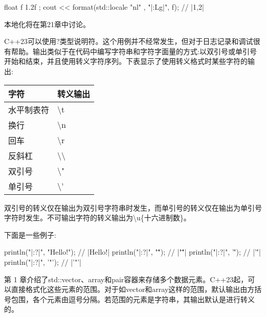 \begin{cpp}
float f { 1.2f };
cout << format(std::locale{ "nl" }, "|{:Lg}|\n", f); // |1,2|
\end{cpp}

本地化将在第21章中讨论。



C++23可以使用?类型说明符。这个用例并不经常发生，但对于日志记录和调试很有帮助。输出类似于在代码中编写字符串和字符字面量的方式:以双引号或单引号开始和结束，并且使用转义字符序列。下表显示了使用转义格式时某些字符的输出:

\begin{longtable}{|l|l|}
\hline
字符       & 转义输出                   \\ \hline
\endfirsthead
%
\endhead
%
水平制表符  & \textbackslash{}t                \\ \hline
换行        & \textbackslash{}n                \\ \hline
回车 & \textbackslash{}r                \\ \hline
反斜杠       & \textbackslash{}\textbackslash{} \\ \hline
双引号    & \textbackslash{}"                \\ \hline
单引号    & \textbackslash{}'                \\ \hline
\end{longtable}

双引号的转义仅在输出为双引号字符串时发生，而单引号的转义仅在输出为单引号字符时发生。不可输出字符的转义输出为\textbackslash{}u\{十六进制数\}。

下面是一些例子:

\begin{cpp}
println("|{:?}|", "Hello\tWorld!\n");   // |Hello\tWorld!\n|
println("|{:?}|", "\"");                // |"\""|
println("|{:?}|", '\'');                // |'\''|
println("|{:?}|", '"');                 // |'"'|
\end{cpp}



第 1 章介绍了std::vector、array和pair容器来存储多个数据元素。C++23起，可以直接格式化这些元素的范围。对于如vector和array这样的范围，默认输出由方括号包围，各个元素由逗号分隔。若范围的元素是字符串，其输出默认是进行转义的。

